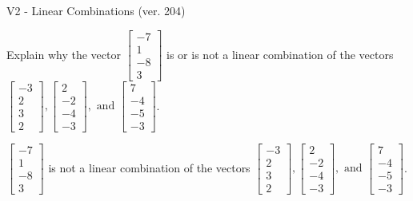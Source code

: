 \begin{exercise}
  \begin{exerciseTitle}V2 - Linear Combinations (ver. 204)\end{exerciseTitle}
  \begin{exerciseStatement}
    Explain why the vector \(\left[\begin{array}{c}
-7 \\
1 \\
-8 \\
3
\end{array}\right]\)  is or is not a linear 
	combination of the vectors \(\left[\begin{array}{c}
-3 \\
2 \\
3 \\
2
\end{array}\right] , \left[\begin{array}{c}
2 \\
-2 \\
-4 \\
-3
\end{array}\right] , \text{ and } \left[\begin{array}{c}
7 \\
-4 \\
-5 \\
-3
\end{array}\right]\).
	


  \end{exerciseStatement}
  \begin{exerciseAnswer}
   \(\left[\begin{array}{c}
-7 \\
1 \\
-8 \\
3
\end{array}\right]\) 
  	 is not  
	a linear combination of the vectors \(\left[\begin{array}{c}
-3 \\
2 \\
3 \\
2
\end{array}\right] , \left[\begin{array}{c}
2 \\
-2 \\
-4 \\
-3
\end{array}\right] , \text{ and } \left[\begin{array}{c}
7 \\
-4 \\
-5 \\
-3
\end{array}\right]\).

	
  


  \end{exerciseAnswer}
\end{exercise}